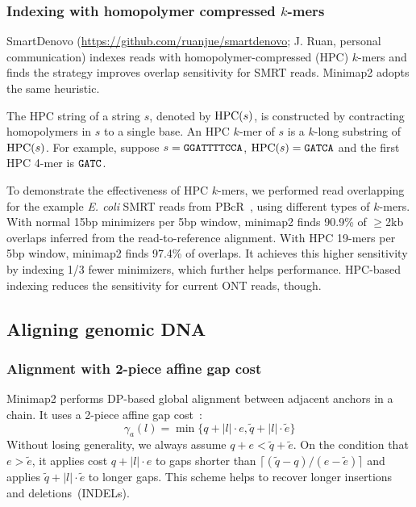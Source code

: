 \documentclass{bioinfo}
\begin{document}
\begin{methods}
\subsubsection{Indexing with homopolymer compressed $k$-mers}
SmartDenovo
(\href{https://github.com/ruanjue/smartdenovo}{https://github.com/ruanjue/smartdenovo};
J. Ruan, personal communication) indexes reads with homopolymer-compressed (HPC)
$k$-mers and finds the strategy improves overlap sensitivity for SMRT reads.
Minimap2 adopts the same heuristic.

The HPC string of a string $s$, denoted by ${\rm HPC}(s)$, is constructed by
contracting homopolymers in $s$ to a single base.  An HPC $k$-mer of $s$ is a
$k$-long substring of ${\rm HPC}(s)$. For example, suppose $s={\tt GGATTTTCCA}$,
${\rm HPC}(s)={\tt GATCA}$ and the first HPC 4-mer is ${\tt GATC}$.

To demonstrate the effectiveness of HPC $k$-mers, we performed read overlapping
for the example {\it E. coli} SMRT reads from PBcR~\citep{Berlin:2015xy}, using
different types of $k$-mers. With normal 15bp minimizers per 5bp window,
minimap2 finds 90.9\% of $\ge$2kb overlaps inferred from the read-to-reference
alignment. With HPC 19-mers per 5bp window, minimap2 finds 97.4\% of overlaps. It achieves this
higher sensitivity by indexing 1/3 fewer minimizers, which further helps
performance. HPC-based indexing reduces the sensitivity for current ONT reads, though.

\subsection{Aligning genomic DNA}\label{sec:genomic}

\subsubsection{Alignment with 2-piece affine gap cost}

Minimap2 performs DP-based global alignment between adjacent anchors in a
chain. It uses a 2-piece affine gap cost~\citep{Gotoh:1990aa}:
\begin{equation}\label{eq:2-piece}
\gamma_a(l)=\min\{q+|l|\cdot e,\tilde{q}+|l|\cdot\tilde{e}\}
\end{equation}
Without losing generality, we always assume $q+e<\tilde{q}+\tilde{e}$.
On the condition that $e>\tilde{e}$, it applies cost $q+|l|\cdot e$ to gaps
shorter than $\lceil(\tilde{q}-q)/(e-\tilde{e})\rceil$ and applies
$\tilde{q}+|l|\cdot\tilde{e}$ to longer gaps.  This scheme helps to recover
longer insertions and deletions~(INDELs).


\end{methods}
\end{document}
